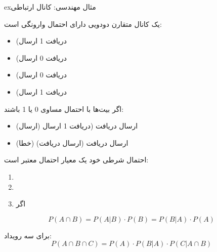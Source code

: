 \begin{PSbox}[unbreakable]{ex}{مثال مهندسی: کانال ارتباطی}

یک کانال متقارن دودویی دارای احتمال وارونگی  است:

\begin{itemize}
\tightlist
\item
  (دریافت 1 \lr{\textbar{}} ارسال 
\item
  (دریافت 0 \lr{\textbar{}} ارسال 
\item
  (دریافت 0 \lr{\textbar{}} ارسال 
\item
  (دریافت 1 \lr{\textbar{}} ارسال 
\end{itemize}

اگر بیت‌ها با احتمال مساوی 0 یا 1 باشند:

\begin{itemize}
\tightlist
\item
  (ارسال \lr{0 \ensuremath{\cap}} دریافت (دریافت 1 \lr{\textbar{}} ارسال (ارسال 
\item
  (خطا) (ارسال \lr{0 \ensuremath{\cap}} دریافت (ارسال \lr{1 \ensuremath{\cap}} دریافت 
\end{itemize}

\end{PSbox}


احتمال شرطی خود یک معیار احتمال معتبر است:

\begin{enumerate}
\def\labelenumi{\arabic{enumi}.}
\tightlist
\item
\item
\item
   اگر 
\end{enumerate}


\[P(A \cap B) = P(A|B) \cdot P(B) = P(B|A) \cdot P(A)\]

برای سه رویداد:\PSbr{}\[P(A \cap B \cap C) = P(A) \cdot P(B|A) \cdot P(C|A \cap B)\]

